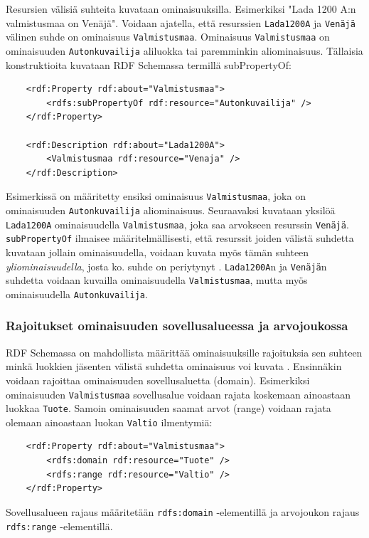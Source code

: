\documentclass[finnish]{tktltiki2}
\theoremstyle{definition}
\theoremstyle{remark}
\begin{document}
Resursien välisiä suhteita kuvataan ominaisuuksilla. Esimerkiksi "Lada 1200 A:n valmistusmaa on Venäjä". Voidaan ajatella, että resurssien \texttt{Lada1200A} ja \texttt{Venäjä} välinen suhde on ominaisuus \texttt{Valmistusmaa}. Ominaisuus \texttt{Valmistusmaa} on ominaisuuden \texttt{Autonkuvailija}  aliluokka tai paremminkin aliominaisuus. Tällaisia konstruktioita kuvataan RDF Schemassa termillä subPropertyOf: 
\begin{verbatim}
    <rdf:Property rdf:about="Valmistusmaa">
        <rdfs:subPropertyOf rdf:resource="Autonkuvailija" />
    </rdf:Property>

    <rdf:Description rdf:about="Lada1200A">
        <Valmistusmaa rdf:resource="Venaja" />
    </rdf:Description>
\end{verbatim}
Esimerkissä on määritetty ensiksi ominaisuus \texttt{Valmistusmaa}, joka on ominaisuuden \texttt{Autonkuvailija} aliominaisuus. Seuraavaksi kuvataan yksilöä \texttt{Lada1200A} ominaisuudella \texttt{Valmistusmaa}, joka saa arvokseen resurssin \texttt{Venäjä}. \texttt{subPropertyOf} ilmaisee määritelmällisesti, että resurssit joiden välistä suhdetta kuvataan jollain ominaisuudella, voidaan kuvata myös tämän suhteen \textit{yliominaisuudella}, josta ko. suhde on periytynyt \cite{RDFS}. \texttt{Lada1200A}n ja \texttt{Venäjä}n suhdetta voidaan kuvailla ominaisuudella \texttt{Valmistusmaa}, mutta myös ominaisuudella \texttt{Autonkuvailija}. 

\subsubsection{Rajoitukset ominaisuuden sovellusalueessa ja arvojoukossa}
RDF Schemassa on mahdollista määrittää ominaisuuksille rajoituksia sen suhteen minkä luokkien jäsenten välistä suhdetta ominaisuus voi kuvata \cite{RDFS}. Ensinnäkin
voidaan rajoittaa ominaisuuden sovellusaluetta (domain). Esimerkiksi ominaisuuden  \texttt{Valmistusmaa} sovellusalue voidaan rajata koskemaan ainoastaan luokkaa \texttt{Tuote}. Samoin 
ominaisuuden saamat arvot (range) voidaan rajata olemaan ainoastaan luokan \texttt{Valtio} ilmentymiä: 
\begin{verbatim}
    <rdf:Property rdf:about="Valmistusmaa">
        <rdfs:domain rdf:resource="Tuote" />
        <rdfs:range rdf:resource="Valtio" />
    </rdf:Property>
\end{verbatim}
Sovellusalueen rajaus määritetään \texttt{rdfs:domain} -elementillä ja arvojoukon rajaus \texttt{rdfs:range} -elementillä.  
\end{document}
